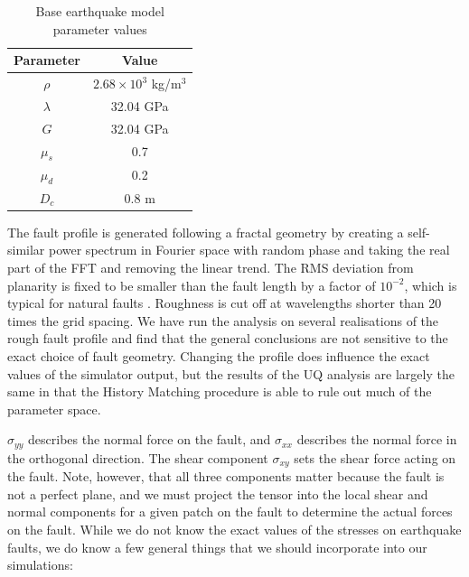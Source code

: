 \documentclass[openacc]{rstransa}%
\begin{document}
\begin{table}[!h]
\caption{Base earthquake model parameter values}
\label{table_eq}
\begin{tabular}{cc}%
\hline
Parameter & Value \\
\hline
$\rho$ & $2.68 \times 10^3$ kg/m$^3$ \\
$\lambda$ & 32.04 GPa \\
$G$ & 32.04 GPa \\
$\mu_s$ & 0.7 \\
$\mu_d$ & 0.2 \\
$D_c$ & 0.8 m \\
\hline
\end{tabular}
\vspace*{-4pt}
\end{table}%

The fault profile is generated following a fractal geometry by creating a self-similar power spectrum in
Fourier space with random phase and taking the real part of the FFT and removing the linear trend.
The RMS deviation from planarity is fixed to be smaller than the fault length by a factor of $10^{-2}$,
which is typical
for natural faults \cite{dunhametal}. Roughness is cut off at wavelengths shorter than 20 times the
grid spacing. We have run the analysis on several realisations of the rough
fault profile and find that the general conclusions are not sensitive
to the exact choice of fault geometry. Changing the profile does influence
the exact values of the simulator output, but the results of the UQ analysis
are largely the same in that the History Matching procedure is able to rule out
much of the parameter space.

$\sigma_{yy}$ describes the normal force on the fault, and $\sigma_{xx}$ describes the normal force in the orthogonal direction. The shear component $\sigma_{xy}$ sets the shear force acting on the fault. Note, however, that all three components matter because the fault is not a perfect plane, and we must project the tensor into the local shear and normal components for a given patch on the fault to determine the actual forces on the fault.
While we do not know the exact values of the stresses on earthquake faults, we do know a few general things that we should incorporate into our simulations:
\end{document}
